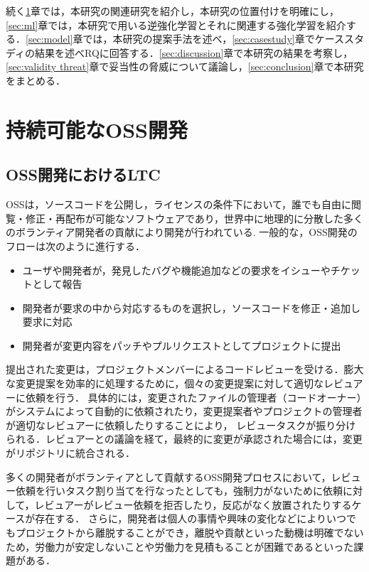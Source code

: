 \documentclass[11pt]{jreport}
\begin{document}
続く\ref{sec:related}章では，本研究の関連研究を紹介し，本研究の位置付けを明確にし，\ref{sec:ml}章では，本研究で用いる逆強化学習とそれに関連する強化学習を紹介する．\ref{sec:model}章では，本研究の提案手法を述べ，\ref{sec:casestudy}章でケーススタディの結果を述べRQに回答する．\ref{sec:discussion}章で本研究の結果を考察し，\ref{sec:validity threat}章で妥当性の脅威について議論し，\ref{sec:conclusion}章で本研究をまとめる．




\chapter{持続可能なOSS開発}\label{sec:related}
\section{OSS開発におけるLTC}
OSSは，ソースコードを公開し，ライセンスの条件下において，誰でも自由に閲覧・修正・再配布が可能なソフトウェアであり，世界中に地理的に分散した多くのボランティア開発者の貢献により開発が行われている\cite{motivation}.
一般的な，OSS開発のフローは次のように進行する．
\begin{itemize}
    \item ユーザや開発者が，発見したバグや機能追加などの要求をイシューやチケットとして報告
    \item 開発者が要求の中から対応するものを選択し，ソースコードを修正・追加し要求に対応
    \item 開発者が変更内容をパッチやプルリクエストとしてプロジェクトに提出
\end{itemize}

提出された変更は，プロジェクトメンバーによるコードレビューを受ける．膨大な変更提案を効率的に処理するために，個々の変更提案に対して適切なレビュアーに依頼を行う．
具体的には，変更されたファイルの管理者（コードオーナー）がシステムによって自動的に依頼されたり，変更提案者やプロジェクトの管理者が適切なレビュアーに依頼したりすることにより，
レビュータスクが振り分けられる．レビュアーとの議論を経て，最終的に変更が承認された場合には，変更がリポジトリに統合される．

多くの開発者がボランティアとして貢献するOSS開発プロセスにおいて，レビュー依頼を行いタスク割り当てを行なったとしても，強制力がないために依頼に対して，レビュアーがレビュー依頼を拒否したり，反応がなく放置されたりするケースが存在する．
さらに，開発者は個人の事情や興味の変化などによりいつでもプロジェクトから離脱することができ，離脱や貢献といった動機は明確でないため，労働力が安定しないことや労働力を見積もることが困難であるといった課題がある．
\end{document}
